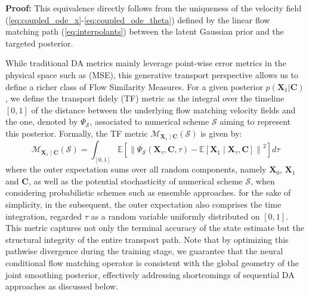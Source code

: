 \documentclass[10pt]{article}
\begin{document}
{\bf Proof:} This equivalence directly follows from the uniqueness of the velocity field (\ref{eq:coupled_ode_x}-\ref{eq:coupled_ode_theta}) defined by the linear flow matching path (\ref{eq:interpolants}) between the latent Gaussian prior and the targeted posterior.

While traditional DA metrics mainly leverage point-wise error metrics in the physical space such as (MSE), this generative transport perspective allows us to define a richer class of Flow Similarity Measures. For a given posterior $p(\mathbf{X}_1 |\mathbf{C})$, we define the transport fidely (TF) metric as the integral over the timeline $[0, 1]$ of the distance between the underlying flow matching velocity fields and the one, denoted by $\Psi_\mathcal{S}$, associated to numerical scheme $\mathcal{S}$ aiming to represent this posterior. Formally, the TF metric  $\mathcal{M}_{\mathbf{X}_1\mid \mathbf{C}}\left( \mathcal{S} \right)$ is given by:
\begin{equation}
    \label{eq: CFM metric}
    \mathcal{M}_{\mathbf{X}_1\mid \mathbf{C}}\left( \mathcal{S} \right)
    = \int_{[0,1]} \mathbb{E} \left [  \left \| \Psi_\mathcal{S}\left (\mathbf{X}_\tau, \mathbf{C},\tau \right ) - \mathbb{E}\left [\mathbf{X}_1 \mid \mathbf{X}_\tau,\mathbf{C}\right ] \right \|^2 \right ] d\tau
\end{equation}
where the outer expectation sums over all random components, namely $\mathbf{X}_0$, $\mathbf{X}_1$ and $\mathbf{C}$, as well as the potential stochasticity of numerical scheme $\mathcal{S}$, when considering probabilistic schemes such as ensemble approaches. for the sake of simplicity, in the subsequent, the outer expectation also comprises the time integration, regarded $\tau$ as a random variable uniformly distributed on $[0,1]$. This metric captures not only the terminal accuracy of the state estimate but the structural integrity of the entire transport path. Note that by optimizing this pathwise divergence during the training stage, we guarantee that the neural conditional flow matching operator is consistent with the global geometry of the joint smoothing posterior, effectively addressing shortcomings of sequential DA approaches as discussed below. 
\end{document}
